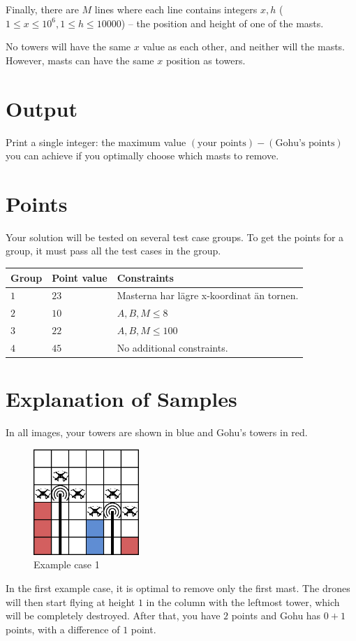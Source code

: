 Finally, there are $M$ lines where each line contains integers $x, h$ ($1 \leq x \leq 10^6, 1 \leq h \leq 10000$) -- the position and height of one of the masts.

No towers will have the same $x$ value as each other, and neither will the masts.
However, masts can have the same $x$ position as towers.

\section*{Output}
Print a single integer: the maximum value $(\text{your points}) - (\text{Gohu's points})$ you can achieve if you optimally choose which masts to remove.

\section*{Points}
Your solution will be tested on several test case groups.
To get the points for a group, it must pass all the test cases in the group.

\noindent
\begin{tabular}{| l | l | l |}
  \hline
  \textbf{Group} & \textbf{Point value} & \textbf{Constraints} \\ \hline
  $1$   & $23$       & Masterna har lägre x-koordinat än tornen. \\ \hline
  $2$   & $10$       & $A,B,M \leq 8$\\ \hline
  $3$   & $22$       & $A,B,M \leq 100$  \\ \hline
  $4$   & $45$       & No additional constraints. \\ \hline
\end{tabular}

\section*{Explanation of Samples}
In all images, your towers are shown in blue and Gohu's towers in red.

\begin{figure}[!h]
  \centering
  \includegraphics[width=4cm]{sample1.png}
  \caption{Example case 1}
\end{figure}
In the first example case, it is optimal to remove only the first mast.
The drones will then start flying at height $1$ in the column with the leftmost tower, which will be completely destroyed.
After that, you have $2$ points and Gohu has $0 + 1$ points, with a difference of $1$ point.


